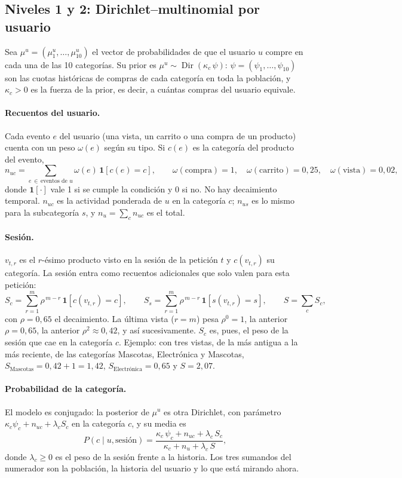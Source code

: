 \documentclass[11pt,a4paper]{article}
\newcommand{\Dir}{\operatorname{Dir}}
\begin{document}
\subsection{Niveles 1 y 2: Dirichlet--multinomial por usuario}

Sea $\mu^u=(\mu^u_1,\dots,\mu^u_{10})$ el vector de probabilidades de que el usuario $u$ compre en cada
una de las 10 categorías. Su prior es $\mu^u\sim\Dir(\kappa_c\,\psi)$: $\psi=(\psi_1,\dots,\psi_{10})$ son
las cuotas históricas de compras de cada categoría en toda la población, y $\kappa_c>0$ es la fuerza de
la prior, es decir, a cuántas compras del usuario equivale.

\paragraph{Recuentos del usuario.} Cada evento $e$ del usuario (una vista, un carrito o una compra de
un producto) cuenta con un peso $\omega(e)$ según su tipo. Si $c(e)$ es la categoría del producto del
evento,
\[
n_{uc}=\sum_{e\,\in\,\text{eventos de }u}\omega(e)\,\mathbf 1[c(e)=c],\qquad
\omega(\text{compra})=1,\quad \omega(\text{carrito})=0{,}25,\quad \omega(\text{vista})=0{,}02 ,
\]
donde $\mathbf 1[\cdot]$ vale 1 si se cumple la condición y 0 si no. No hay decaimiento temporal.
$n_{uc}$ es la actividad ponderada de $u$ en la categoría $c$; $n_{us}$ es lo mismo para la subcategoría
$s$, y $n_u=\sum_c n_{uc}$ es el total.

\paragraph{Sesión.} $v_{t,r}$ es el $r$-ésimo producto visto en la sesión de la petición $t$ y
$c(v_{t,r})$ su categoría. La sesión entra como recuentos adicionales que solo valen para esta petición:
\[
S_c=\sum_{r=1}^{m}\rho^{\,m-r}\,\mathbf 1[c(v_{t,r})=c],\qquad
S_s=\sum_{r=1}^{m}\rho^{\,m-r}\,\mathbf 1[s(v_{t,r})=s],\qquad
S=\sum_c S_c ,
\]
con $\rho=0{,}65$ el decaimiento. La última vista ($r=m$) pesa $\rho^0=1$, la anterior $\rho=0{,}65$, la
anterior $\rho^2\approx0{,}42$, y así sucesivamente. $S_c$ es, pues, el peso de la sesión que cae en la
categoría $c$. Ejemplo: con tres vistas, de la más antigua a la más reciente, de las categorías
Mascotas, Electrónica y Mascotas, $S_{\text{Mascotas}}=0{,}42+1=1{,}42$,
$S_{\text{Electrónica}}=0{,}65$ y $S=2{,}07$.

\paragraph{Probabilidad de la categoría.} El modelo es conjugado: la posterior de $\mu^u$ es otra
Dirichlet, con parámetro $\kappa_c\psi_c+n_{uc}+\lambda_c S_c$ en la categoría $c$, y su media es
\begin{equation}
P(c\mid u,\text{sesión})=\frac{\kappa_c\,\psi_c+n_{uc}+\lambda_c\,S_c}{\kappa_c+n_{u}+\lambda_c\,S},
\label{eq:cat}
\end{equation}
donde $\lambda_c\ge0$ es el peso de la sesión frente a la historia. Los tres sumandos del numerador son
la población, la historia del usuario y lo que está mirando ahora.
\end{document}
